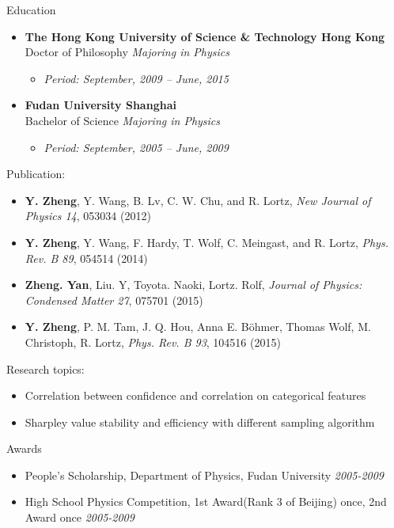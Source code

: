 \documentclass[a4paper,8pt,oneside]{scrartcl}
\newenvironment{ressection}[1]{
    \vspace{2pt}
    {\selectfont#1}
    \begin{itemize}
    \vspace{0pt}
}{
    \end{itemize}
}
\newcommand{\resitem}[1]{
    \vspace{-4pt}
    \item #1
}
\newcommand{\resitems}[1]{
    \vspace{-4pt}
    \item #1
}
\newcommand{\ressubitem}[1]{
    \vspace{0pt}
    \item #1
}
\newcommand{\resbigitem}[3]{
    \vspace{-5pt}
    \item
    \textbf{#1}\\
    #2
    \textit{#3}
}
\newenvironment{ressubsec}[3]{
    \resbigitem{#1}{#2}{#3}
    \vspace{-2pt}
    \begin{itemize}
}{
    \end{itemize}
}
\begin{document}
\begin{ressection}{Education}
    \begin{ressubsec}{The Hong Kong University of Science \& Technology \hfill Hong Kong}{Doctor of Philosophy}{Majoring in Physics}
        \ressubitem{\itshape Period: September, 2009 -- June, 2015}
    \end{ressubsec}
    \begin{ressubsec}{Fudan University \hfill Shanghai}{Bachelor of Science}{Majoring in Physics}
        \ressubitem{\itshape Period: September, 2005 -- June, 2009}
    \end{ressubsec}
\end{ressection}

\begin{ressection}{Publication:}
  \resitems{\textbf{Y. Zheng}, Y. Wang, B. Lv, C. W. Chu, and R. Lortz, \emph{New Journal of Physics 14}, 053034 (2012)}
  \resitems{\textbf{Y. Zheng}, Y. Wang, F. Hardy, T. Wolf, C. Meingast, and R. Lortz, \emph{Phys. Rev. B 89}, 054514 (2014)}
  \resitems{\textbf{Zheng. Yan}, Liu. Y, Toyota. Naoki, Lortz. Rolf, \emph{Journal of Physics: Condensed Matter 27}, 075701 (2015)}
  \resitems{\textbf{Y. Zheng}, P. M. Tam, J. Q. Hou, Anna E. Böhmer, Thomas Wolf, M. Christoph, R. Lortz, \emph{Phys. Rev. B 93}, 104516 (2015)}
\end{ressection}

\begin{ressection}{Research topics:}
	\resitems{Correlation between confidence and correlation on categorical features}
	\resitems{Sharpley value stability and efficiency with different sampling algorithm}
\end{ressection}

\begin{ressection}{Awards}
	\resitems{People's Scholarship, Department of Physics, Fudan University}\hfill
	\emph{2005-2009}
	\resitems{High School Physics Competition, 1st Award(Rank 3 of Beijing) once, 2nd Award once}\hfill
	\emph{2005-2009}
\end{ressection}

\end{document}
